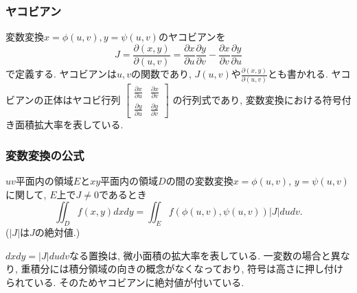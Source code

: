 

\begin{frame}
\frametitle{ヤコビアン}

変数変換$x=\phi(u,v), y=\psi(u,v)$のヤコビアンを
$$
J
=\frac{\partial(x,y)}{\partial(u,v)}=\frac{\partial x}{\partial u}\frac{\partial y}{\partial v}-\frac{\partial x}{\partial v}\frac{\partial y}{\partial u}
$$
で定義する. 
ヤコビアンは$u,v$の関数であり, $J(u,v)$や$\frac{\partial(x,y)}{\partial(u,v)}$とも書かれる. 
ヤコビアンの正体はヤコビ行列
$\begin{bmatrix}\frac{\partial x}{\partial u} & \frac{\partial x}{\partial v} \\ \frac{\partial y}{\partial u} &\frac{\partial y}{\partial v} \end{bmatrix}$
の行列式であり, 変数変換における符号付き面積拡大率を表している. 

\end{frame}




\begin{frame}
\frametitle{変数変換の公式}


\begin{Thm} \label{二重積分_変換公式}
$uv$平面内の領域$E$と$xy$平面内の領域$D$の間の変数変換$x=\phi(u,v)$, $y=\psi(u,v)$に関して, $E$上で$J\ne0$であるとき
$$
\iint_D f(x,y)dxdy = \iint_E f(\phi(u,v),\psi(u,v))|J|dudv. 
$$
($|J|$は$J$の絶対値.) 
\end{Thm}
$dxdy=|J|dudv$なる置換は, 微小面積の拡大率を表している. 
一変数の場合と異なり, 重積分には積分領域の向きの概念がなくなっており, 符号は高さに押し付けられている. 
そのためヤコビアンに絶対値が付いている.  

\end{frame}






